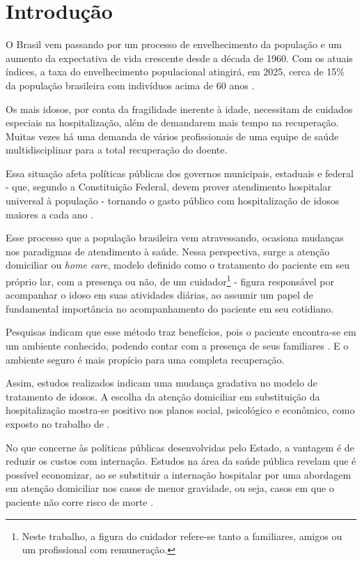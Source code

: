 \chapter{Introdução}\label{cap:introducao}

O Brasil vem passando por um processo de envelhecimento da população e
um aumento da expectativa de vida crescente desde a década de 1960. 
Com os atuais índices, a taxa do envelhecimento populacional atingirá, 
em 2025, cerca de 15\% da população brasileira com indivíduos acima 
de 60 anos \cite{gonccalves2006perfil}. 

Os mais idosos, por conta da fragilidade inerente à idade, necessitam de 
cuidados especiais na hospitalização, além de demandarem mais tempo na 
recuperação. Muitas vezes há uma demanda de vários profissionais de uma equipe 
de saúde multidisciplinar para a total recuperação do doente.

Essa situação afeta políticas públicas dos governos municipais, estaduais e
federal - que, segundo a Constituição Federal, devem prover atendimento
hospitalar universal à população - tornando o gasto público com hospitalização
de idosos maiores a cada ano \cite{da2013gastos}.

Esse processo que a população brasileira vem atravessando, ocasiona
mudanças  nos paradigmas de atendimento à saúde. Nessa perspectiva, surge a
atenção domiciliar ou \textit{home care}, modelo definido como o tratamento do
paciente em seu próprio lar, com a presença ou não, de um
cuidador\footnote{Neste trabalho, a figura do cuidador refere-se tanto a
familiares, amigos ou um profissional com remuneração.} - figura responsável por
acompanhar o idoso em suas atividades diárias, ao assumir um papel de
fundamental importância no acompanhamento do paciente em seu cotidiano.

Pesquisas indicam que esse método traz benefícios, pois o  paciente encontra-se
em um ambiente conhecido, podendo contar com a presença de seus familiares
\cite{hermann2007atendimento, day2010beneficios}. E o ambiente seguro é mais
propício para uma completa recuperação.

Assim, estudos realizados indicam uma mudança gradativa no modelo de tratamento
de idosos. A escolha da atenção domiciliar em substituição da hospitalização 
mostra-se positivo nos planos social, psicológico e econômico, como exposto
no trabalho de .

No que concerne às políticas públicas desenvolvidas pelo Estado,  a vantagem é
de reduzir os custos com internação. Estudos na área da saúde pública revelam
que é possível economizar, ao se substituir a internação hospitalar por uma
abordagem em atenção domiciliar nos casos de menor gravidade,  ou seja, casos
em que o paciente não corre risco de morte \cite{bourdette1993health}.  

